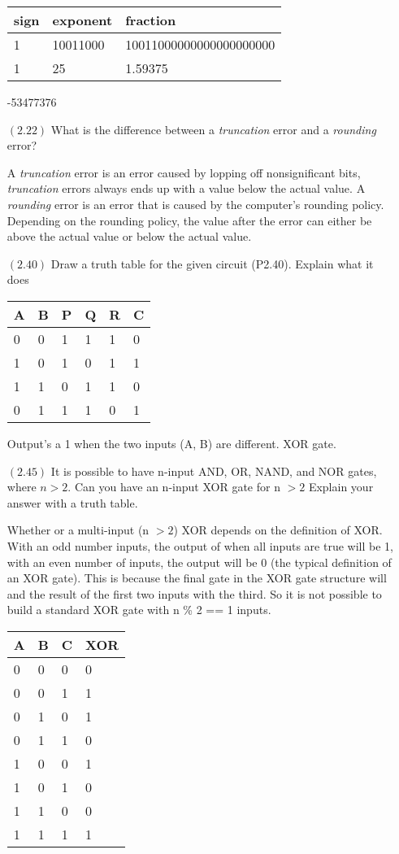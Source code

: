 \documentclass[letterpaper,10pt,titlepage]{article}
\begin{document}
\begin{enumerate}
    \begin{tabular}{lll}
    sign & exponent & fraction                \\
	\hline    
    1   & 10011000 & 10011000000000000000000 \\
    1   & 25 & 1.59375
    \end{tabular}
    
    -53477376




\item[$(2.22)$]What is the difference between a \textit{truncation} error and a \textit{rounding} error?

A \textit{truncation} error is an error caused by lopping off nonsignificant bits, \textit{truncation} errors always ends up with a value below the actual value. A \textit{rounding} error is an error that is caused by the computer's rounding policy. Depending on the rounding policy, the value after the error can either be above the actual value or below the actual value.

\item[$(2.40)$] Draw a truth table for the given circuit (P2.40). Explain what it does

	\begin{tabular}{llllll}
    A & B & P & Q & R & C                   \\
	\hline
	0 & 0 & 1 & 1 & 1 & 0 \\    
    1 & 0 & 1 & 0 & 1 & 1 \\
    1 & 1 & 0 & 1 & 1 & 0 \\    
    0 & 1 & 1 & 1 & 0 & 1
    \end{tabular}
    
    Output's a 1 when the two inputs (A, B) are different. XOR gate.


\item[$(2.45)$] It is possible to have n-input AND, OR, NAND, and NOR gates, where $n > 2$. Can you have an n-input XOR gate for n $> 2$ Explain your answer with a truth table. 

Whether or a multi-input (n $> 2$) XOR depends on the definition of XOR. With an odd number inputs, the output of when all inputs are true will be 1, with an even number of inputs, the output will be 0 (the typical definition of an XOR gate). This is because the final gate in the XOR gate structure will and the result of the first two inputs with the third. So it is not possible to build a standard XOR gate with n \% 2 == 1 inputs.

	\begin{tabular}{lll|l}
    A & B & C & XOR       \\
	\hline
	0 & 0 & 0 & 0  \\    
	0 & 0 & 1 & 1  \\ 
	0 & 1 & 0 & 1  \\ 
	0 & 1 & 1 & 0  \\ 
	1 & 0 & 0 & 1  \\ 
	1 & 0 & 1 & 0  \\ 
	1 & 1 & 0 & 0  \\ 
	1 & 1 & 1 & 1  \\ 
    \end{tabular}
%



\end{enumerate}
\end{document}
